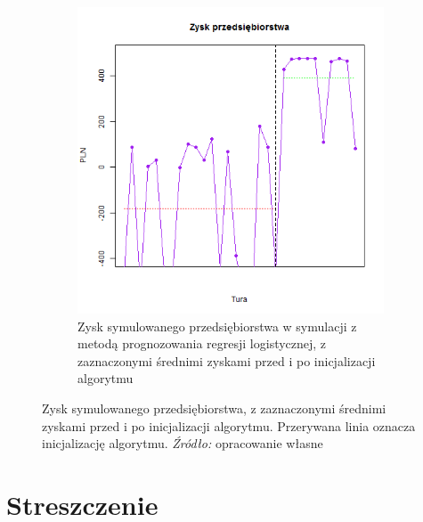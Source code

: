 \documentclass[polish, twoside, 12pt, a4paper]{article}
\theoremstyle{definition}
\theoremstyle{plain}
\theoremstyle{remark}
\begin{document}
\begin{figure}[hbt]
\begin{subfigure}[t]{0.45\textwidth}
    \includegraphics[width=\textwidth]{pictures/zysk_km.png}
    \caption{Zysk symulowanego przedsiębiorstwa w symulacji z metodą prognozowania regresji logistycznej, z zaznaczonymi średnimi zyskami przed i po inicjalizacji algorytmu}
    \label{fig:zysk}
  \end{subfigure}
  
  \captionsetup{margin=10pt,font=small,labelfont=bf,width=.8\textwidth}

  \caption[Zysk symulowanego przedsiębiorstwa]{Zysk symulowanego przedsiębiorstwa, z zaznaczonymi średnimi zyskami przed i po inicjalizacji algorytmu. Przerywana linia oznacza inicjalizację algorytmu. \textit{Źródło:} opracowanie własne}\label{fig:wynikifin}
\end{figure}


\appendix

\clearpage



\clearpage
{}
\listoftables

\clearpage
{}
\listoffigures



\clearpage
{}
\section*{Streszczenie}
\end{document}
